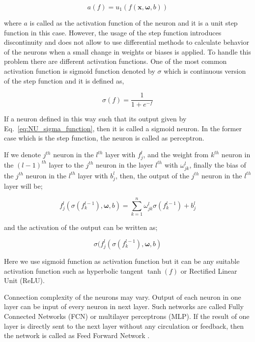 \documentclass[a4paper,times,hidelinks,12pt]{article}
\begin{document}
\begin{equation}
\label{eq:NU_step_function}
a(f) = u_1(f(\boldsymbol{x}, \boldsymbol{\omega}, b))
\end{equation}

\noindent where $a$ is called as the activation function of the neuron and it is a unit step function in this case. However, the usage of the step function introduces discontinuity and does not allow to use differential methods to calculate behavior of the neurons when a small change in weights or biases is applied. To handle this problem there are different activation functions. 
One of the most common activation function is sigmoid function denoted by $\sigma$ which is continuous version of the step function and it is defined as,

\begin{equation}
\label{eq:NU_sigma_function}
\sigma(f) = \frac{1}{1 + e^{-f}}
\end{equation}

\noindent If a neuron defined in this way such that its output given by Eq.~\eqref{eq:NU_sigma_function}, then it is called a sigmoid neuron. In the former case which is the step function, the neuron is called as perceptron. 

If we denote $j^{th}$ neuron in the $l^{th}$ layer with $f_j^l$, and the weight from $k^{th}$ neuron in the $(l-1)^{th}$ layer to the $j^{th}$ neuron in the layer $l^{th}$ with $\omega_{jk}^l$, finally the bias of the $j^{th}$ neuron in the $l^{th}$ layer with ${b_j^l}$, then, the output of the $j^{th}$ neuron in the $l^{th}$ layer will be;

\begin{equation}
\label{eq:NU_neuron_connection}
f_j^{l}(\sigma(f_k^{l-1}), \boldsymbol{\omega}, b) = \sum\limits_{k=1}^{n} \omega_{jk}^{l}\sigma(f_k^{l-1}) + b_j^l
\end{equation}

\noindent and the activation of the output can be written as;

\begin{equation}
\sigma(f_j^{l}(\sigma(f_k^{l-1}), \boldsymbol{\omega}, b)
\end{equation}


\noindent Here we use sigmoid function as activation function but it can be any suitable activation function such as hyperbolic tangent $\tanh(f)$ or Rectified Linear Unit (ReLU).

Connection complexity of the neurons may vary. Output of each neuron in one layer can be input of every neuron in next layer. Such networks are called Fully Connected Networks (FCN) or multilayer perceptrons (MLP). If the result of one layer is directly sent to the next layer without any circulation or feedback, then the network is called as Feed Forward Network \cite{nielsen2015neural}.
\end{document}
